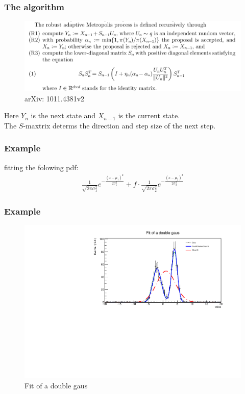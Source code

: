 \documentclass{beamer}
\begin{document}
\begin{frame}
 \frametitle{The algorithm}
 \begin{figure}
  \includegraphics[width=1.0\linewidth]{figures/Metropolis}
  \caption{arXiv: 1011.4381v2}
 \end{figure}
 Here $Y_n$ is the next state and $X_{n-1}$ is the current state. \\
 The $S$-maxtrix determs the direction and step size of the next step. \\
\end{frame}


\begin{frame}
 \frametitle{Example}
 fitting the folowing pdf:
 \begin{align}
  \frac{1}{\sqrt{2 \pi \sigma_1^2}} e^{- \frac{(x-\mu_1)^2}{2 \sigma_1^2}} + f \cdot  \frac{1}{\sqrt{2 \pi \sigma_2^2}} e^{- \frac{(x-\mu_2)^2}{2 \sigma_2^2}}
 \end{align}

\end{frame}

\begin{frame}
 \frametitle{Example}
 \begin{figure}
  \includegraphics[width=1.0\linewidth]{figures/twogausFit}
  \caption{Fit of a double gaus}
 \end{figure}
\end{frame}
\end{document}
